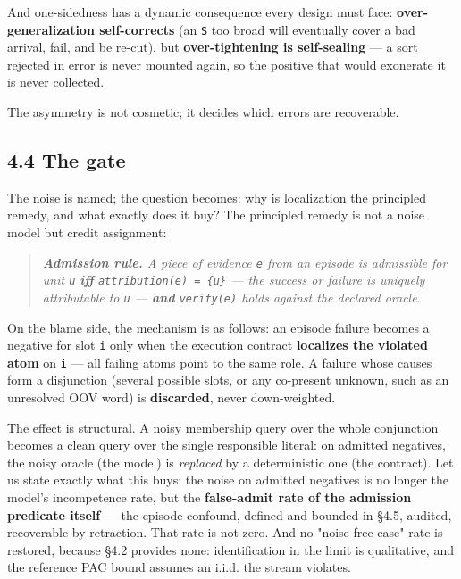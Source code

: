 \documentclass[11pt]{article}
\begin{document}
And one-sidedness has a dynamic consequence every design must face: \textbf{over-generalization self-corrects} (an \texttt{S} too broad will eventually cover a bad arrival, fail, and be re-cut), but \textbf{over-tightening is self-sealing} — a sort rejected in error is never mounted again, so the positive that would exonerate it is never collected.

The asymmetry is not cosmetic; it decides which errors are recoverable.

\subsection*{4.4 The gate}

The noise is named; the question becomes: why is localization the principled remedy, and what exactly does it buy? The principled remedy is not a noise model but credit assignment:

\begin{quote}\itshape \textbf{Admission rule.} A piece of evidence \texttt{e} from an episode is admissible for unit \texttt{u} \textbf{iff} \texttt{attribution(e) = \{u\}} — the success or failure is uniquely attributable to \texttt{u} — \textbf{and} \texttt{verify(e)} holds against the declared oracle.\end{quote}

On the blame side, the mechanism is as follows: an episode failure becomes a negative for slot \texttt{i} only when the execution contract \textbf{localizes the violated atom} on \texttt{i} — all failing atoms point to the same role. A failure whose causes form a disjunction (several possible slots, or any co-present unknown, such as an unresolved OOV word) is \textbf{discarded}, never down-weighted.

The effect is structural. A noisy membership query over the whole conjunction becomes a clean query over the single responsible literal: on admitted negatives, the noisy oracle (the model) is \emph{replaced} by a deterministic one (the contract). Let us state exactly what this buys: the noise on admitted negatives is no longer the model's incompetence rate, but the \textbf{false-admit rate of the admission predicate itself} — the episode confound, defined and bounded in §4.5, audited, recoverable by retraction. That rate is not zero. And no "noise-free case" rate is restored, because §4.2 provides none: identification in the limit is qualitative, and the reference PAC bound assumes an i.i.d. the stream violates.
\end{document}
